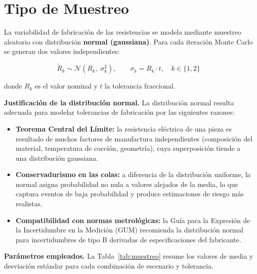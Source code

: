 ﻿\documentclass[12pt, letterpaper]{article}
\begin{document}
\section{Tipo de Muestreo}

La variabilidad de fabricación de las resistencias se modela mediante muestreo
aleatorio con distribución \textbf{normal (gaussiana)}. Para cada iteración
Monte Carlo se generan dos valores independientes:

\begin{equation}
    \tilde{R}_k \sim \mathcal{N}(R_k,\; \sigma_k^2), \qquad
    \sigma_k = R_k \cdot t, \quad k \in \{1, 2\}
\end{equation}

donde \(R_k\) es el valor nominal y \(t\) la tolerancia fraccional.

\textbf{Justificación de la distribución normal.}
La distribución normal resulta adecuada para modelar tolerancias de fabricación
por las siguientes razones:

\begin{itemize}[leftmargin=2em]
    \item \textbf{Teorema Central del Límite:} la resistencia eléctrica de una
          pieza es resultado de muchos factores de manufactura independientes
          (composición del material, temperatura de cocción, geometría), cuya
          superposición tiende a una distribución gaussiana.
    \item \textbf{Conservadurismo en las colas:} a diferencia de la distribución
          uniforme, la normal asigna probabilidad no nula a valores alejados de la
          media, lo que captura eventos de baja probabilidad y produce estimaciones
          de riesgo más realistas.
    \item \textbf{Compatibilidad con normas metrológicas:} la Guía para la
          Expresión de la Incertidumbre en la Medición (GUM) recomienda la
          distribución normal para incertidumbres de tipo B derivadas de
          especificaciones del fabricante.
\end{itemize}

\textbf{Parámetros empleados.} La Tabla~\ref{tab:muestreo} resume los valores
de media y desviación estándar para cada combinación de escenario y tolerancia.
\end{document}
